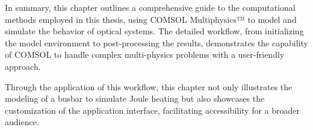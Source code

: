 In summary, this chapter outlines a comprehensive guide to the computational methods employed in this thesis, using COMSOL Multiphysics™ to model and simulate the behavior of optical systems. The detailed workflow, from initializing the model environment to post-processing the results, demonstrates the capability of COMSOL to handle complex multi-physics problems with a user-friendly approach.

Through the application of this workflow, this chapter not only illustrates the modeling of a busbar to simulate Joule heating but also showcases the customization of the application interface, facilitating accessibility for a broader audience.